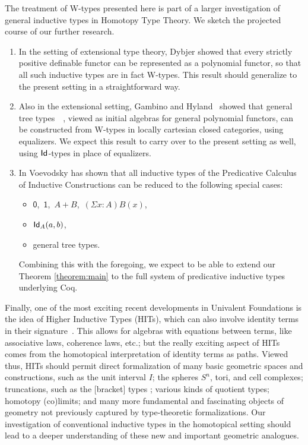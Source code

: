 The treatment of W-types presented here is part of a larger investigation of general inductive types in Homotopy Type Theory.  We sketch the projected course of our further research.

\begin{enumerate}
\item  In the setting of  extensional type theory, Dybjer \cite{DybjerP:repids} showed that every strictly positive definable functor can be represented as a polynomial functor, so that all such inductive types are in fact W-types.  This result should generalize to the present setting in a straightforward way.

\item Also in the extensional setting, Gambino and Hyland~\cite{GambinoN:weltdp} showed that 
general tree types~\cite{PeterssonK:setcis}~\cite[Chapter~16]{NordstromB:promlt}, viewed as 
initial algebras for general polynomial functors, can be constructed from W-types in
locally cartesian closed categories, using equalizers. We expect this result to carry over to the present setting as well, using $\mathsf{Id}_{}$-types in place of equalizers.

\item In \cite{VoevodskyV:notts} Voevodsky has shown that all inductive types of the Predicative Calculus of Inductive Constructions can be reduced to the following special cases:
\begin{itemize}
\item $\mathsf{0}$,\ $\mathsf{1}$,\ $A+B$,\  $(\Sigma x : A)B(x)$,
\item $\mathsf{Id}_{A}(a,b)$,
\item general tree types.
\end{itemize}
Combining this with the foregoing, we expect to be able to extend our Theorem \ref{theorem:main} to the full system of predicative inductive types underlying Coq.
\end{enumerate}

\noindent Finally, one of the most exciting recent developments in Univalent Foundations is the 
idea of Higher Inductive Types (HITs), which can also involve identity terms in their signature~\cite{LumsdaineP:higit,ShulmanM:higit}.   This allows for algebras with equations between terms, like associative laws, coherence laws, etc.; but the really exciting aspect of HITs comes from the homotopical interpretation of identity terms as paths.  Viewed thus, HITs should permit direct formalization of many basic geometric spaces and constructions, such as the unit interval $I$; the spheres $S^n$, tori, and cell complexes; truncations, such as the [bracket] types \cite{AwodeyS:prot}; various kinds of quotient types; homotopy (co)limits; and many more fundamental and fascinating objects of geometry not previously captured by type-theoretic formalizations.  Our investigation of conventional inductive types in the homotopical setting should lead to a deeper understanding of these new and important geometric analogues. 